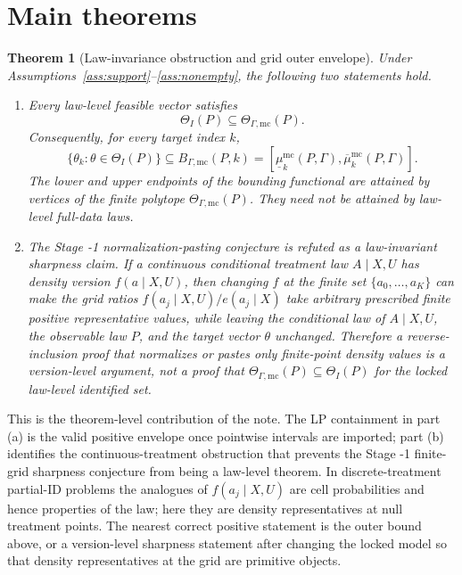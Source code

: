 \documentclass[11pt]{article}
\theoremstyle{definition}
\theoremstyle{plain}
\newtheorem{theorem}{Theorem}
\theoremstyle{remark}
\begin{document}
\section{Main theorems}
\begin{theorem}[Law-invariance obstruction and grid outer envelope]\label{thm:sharp-grid}
Under Assumptions~\ref{ass:support}--\ref{ass:nonempty}, the following two statements hold.
\begin{enumerate}[label=(\alph*),leftmargin=2em]
\item Every law-level feasible vector satisfies
\[
  \Theta_I(P)\subseteq\Theta_{\Gamma,\mathrm{mc}}(P).
\]
Consequently, for every target index \(k\),
\[
  \{\theta_k:\theta\in\Theta_I(P)\}
  \subseteq
  B_{\Gamma,\mathrm{mc}}(P,k)
  =
  [\underline\mu^{\mathrm{mc}}_k(P,\Gamma),
    \overline\mu^{\mathrm{mc}}_k(P,\Gamma)].
\]
The lower and upper endpoints of the bounding functional are attained by vertices of the finite polytope \(\Theta_{\Gamma,\mathrm{mc}}(P)\).  They need not be attained by law-level full-data laws.
\item The Stage -1 normalization-pasting conjecture is refuted as a law-invariant sharpness claim.  If a continuous conditional treatment law \(A\mid X,U\) has density version \(f(a\mid X,U)\), then changing \(f\) at the finite set \(\{a_0,\ldots,a_K\}\) can make the grid ratios \(f(a_j\mid X,U)/e(a_j\mid X)\) take arbitrary prescribed finite positive representative values, while leaving the conditional law of \(A\mid X,U\), the observable law \(P\), and the target vector \(\theta\) unchanged.  Therefore a reverse-inclusion proof that normalizes or pastes only finite-point density values is a version-level argument, not a proof that
\(\Theta_{\Gamma,\mathrm{mc}}(P)\subseteq\Theta_I(P)\) for the locked law-level identified set.
\end{enumerate}
\end{theorem}

This is the theorem-level contribution of the note.  The LP containment in part (a) is the valid positive envelope once pointwise intervals are imported; part (b) identifies the continuous-treatment obstruction that prevents the Stage -1 finite-grid sharpness conjecture from being a law-level theorem.  In discrete-treatment partial-ID problems the analogues of \(f(a_j\mid X,U)\) are cell probabilities and hence properties of the law; here they are density representatives at null treatment points.  The nearest correct positive statement is the outer bound above, or a version-level sharpness statement after changing the locked model so that density representatives at the grid are primitive objects.
\end{document}
